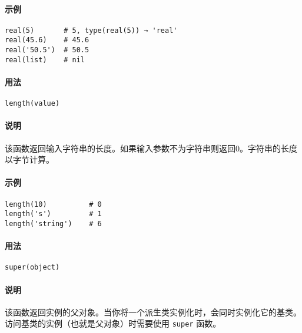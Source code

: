 \paragraph{示例}
\begin{lstlisting}[language=berry, numbers=none]
real(5)       # 5, type(real(5)) → 'real'
real(45.6)    # 45.6
real('50.5')  # 50.5
real(list)    # nil
\end{lstlisting}


\paragraph{用法}
\begin{lstlisting}[language=berry, numbers=none]
length(value)
\end{lstlisting}

\paragraph{说明}
该函数返回输入字符串的长度。如果输入参数不为字符串则返回0。字符串的长度以字节计算。

\paragraph{示例}
\begin{lstlisting}[language=berry, numbers=none]
length(10)          # 0
length('s')         # 1
length('string')    # 6
\end{lstlisting}


\paragraph{用法}
\begin{lstlisting}[language=berry, numbers=none]
super(object)
\end{lstlisting}

\paragraph{说明}
该函数返回实例的父对象。当你将一个派生类实例化时，会同时实例化它的基类。访问基类的实例（也就是父对象）时需要使用 \texttt{super} 函数。

